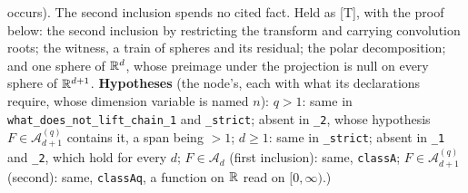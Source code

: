 \begin{proposition}
{occurs). The second inclusion spends no cited fact. Held as [T], with the proof below: the second
inclusion by restricting the transform and carrying convolution roots; the witness, a train of
spheres and its residual; the polar decomposition; and one sphere of $\mathbb{R}^d$, whose preimage under
the projection is null on every sphere of $\mathbb{R}^{d+1}$. \textbf{Hypotheses} (the node's, each with
what its declarations require, whose dimension variable is named $n$): $q > 1$: same in
\texttt{what\_does\_not\_lift\_chain\_1} and
\texttt{\_strict}; absent in \texttt{\_2}, whose hypothesis $F \in \mathcal{A}^{(q)}_{d+1}$
contains it, a span being $> 1$; $d \ge 1$: same in \texttt{\_strict}; absent in \texttt{\_1} and
\texttt{\_2}, which hold for every $d$; $F \in \mathcal{A}_d$ (first inclusion): same,
\texttt{classA}; $F \in \mathcal{A}^{(q)}_{d+1}$ (second): same, \texttt{classAq}, a function on
$\mathbb{R}$ read on $[0,\infty)$.)}
\end{proposition}

